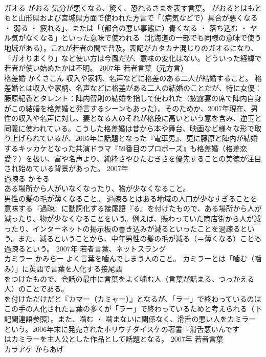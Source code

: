\documentclass[8pt]{extreport}
\begin{document}
\begin{CJK}{UTF8}{min}
\\	ガオる	がおる	気分が悪くなる、驚く、恐れるさまを表す言葉。	がおるとはもともと山形県および宮城県方面で使われた方言で「（病気などで）具合が悪くなる ・ 弱る ・ 疲れる」、または「（都合の悪い事態に）青くなる ・ 落ち込む ・ ヤル気がなくなる」といった意味で使われる（北海道の一部でも同様の意味で使う地域がある）。これが若者の間で普及。表記がカタカナ混じりのガオるになり、「ガオりまくり」など使い方は今風だが、意味の変化はない。どういった経緯で若者が使い始めたかは不明。	2007年	若者言葉（元方言）	
\\	格差婚	かくさこん	収入や家柄、名声などに格差のある二人が結婚すること。	格差婚とは収入や家柄、名声などに格差がある二人の結婚のことだが、特に女優：藤原紀香とタレント：陣内智則の結婚を指して使われた（披露宴の席で陣内自身がこの結婚を格差婚と発言するシーンもあった）。そのためか、2007年現在、男性の収入や名声に対し、妻となる人のそれが格段に高いという意を含み、逆玉と同義に使われている。こうした格差婚は昔から本や舞台、映画など様々な形で取り上げられているが、2005年に話題となった『電車男』、更に藤原と陣内が結婚するキッカケとなった共演ドラマ『59番目のプロポーズ』も格差婚（格差恋愛？）を扱い、富や名声より、純粋さやひたむきさを優先することの美徳が注目され始めている背景があった。	2007年	
\\	過疎る	かそる	
\\	ある場所から人がいなくなったり、物が少なくなること。 
\\	男性の髪の毛が薄くなること。	過疎るとはある地域の人口が少なすぎることを意味する『過疎』に動詞化する接尾語『る』を付けたもので、ある場所から人が減ったり、物が少なくなることをいう。例えば、賑わっていた商店街から人が減ったり、インターネットの掲示板の書き込みが減るといったことを過疎るという。また、減るということから、中年男性の髪の毛が減る（＝薄くなる）ことも過疎るという。	2007年	若者言葉、ネットスラング	
\\	カミラー	かみらー	よく言葉を噛んでしまう人のこと。	カミラーとは「噛む（噛み）」に英語で言葉を人化する接尾語
\\	をつけたもので、会話の最中に言葉をよく噛む人（言葉が詰まる、つっかえる人）のことである。
\\	を付けただけだと『カマー（カミャー）』となるが、「ラー」で終わっているのはこの手の人化された言葉の多くが「ラー」で終わっているためと考えられる（下記関連語参照）。また、噛む ・ 噛まないに関係なく、滑舌の悪い人をカミラーという。2006年末に発売されたホリウチダイスケの著書『滑舌悪いんです 
\\	はカミラーを主人公とした作品として話題となる。	2007年	若者言葉	
\\	カラアゲ	からあげ	

\end{CJK}
\end{document}
